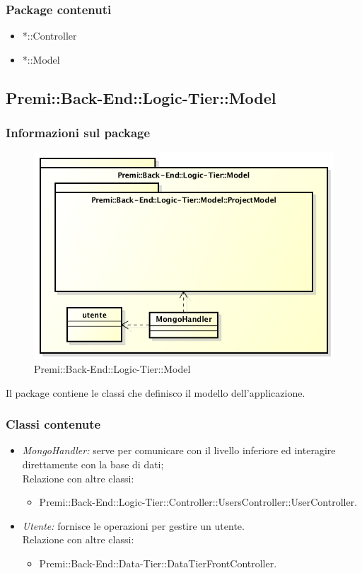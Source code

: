 	\subsubsection{Package contenuti}
	\begin{itemize}
		\item *::Controller
		\item *::Model
	\end{itemize}
	
\newpage
\subsection{Premi::Back-End::Logic-Tier::Model}
	\subsubsection{Informazioni sul package}
	\begin{figure}[h]
	\centering
	\includegraphics[width=0.9\linewidth]{img/back-end-logic-tier-model}
	\caption[Premi::Back-End::Logic-Tier::Model]{Premi::Back-End::Logic-Tier::Model}
	\end{figure}
	Il package contiene le classi che definisco il modello dell'applicazione.
	
	\subsubsection{Classi contenute}
	\begin{itemize}
		\item \textit{MongoHandler: }serve per comunicare con il livello inferiore ed interagire direttamente con la base di dati;
			\\Relazione con altre classi:
			\begin{itemize}
				\item Premi::Back-End::Logic-Tier::Controller::UsersController::UserController.
			\end{itemize}
		\item \textit{Utente: }fornisce le operazioni per gestire un utente.
			\\Relazione con altre classi:
			\begin{itemize}
				\item Premi::Back-End::Data-Tier::DataTierFrontController.
			\end{itemize}
	\end{itemize}
	

